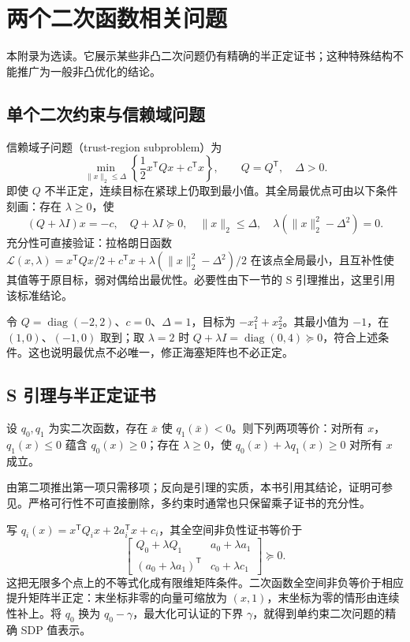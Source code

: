 \setcounter{chapter}{1} %
\chapter{两个二次函数相关问题}
\label{app:co-quadratic}

本附录为选读。它展示某些非凸二次问题仍有精确的半正定证书；这种特殊结构不能推广为一般非凸优化的结论。

\section{单个二次约束与信赖域问题}

信赖域子问题（trust-region subproblem）为
\[
 \min_{\|x\|_2\leq\Delta}\left\{\frac12x^{\mathsf T}Qx+c^{\mathsf T}x\right\},
 \qquad Q=Q^{\mathsf T},\quad\Delta>0.
\]
即使 $Q$ 不半正定，连续目标在紧球上仍取到最小值。其全局最优点可由以下条件刻画：存在 $\lambda\geq0$，使
\[
 (Q+\lambda I)x=-c,\quad Q+\lambda I\succeq0,\quad
 \|x\|_2\leq\Delta,\quad\lambda(\|x\|_2^2-\Delta^2)=0.
\]
充分性可直接验证：拉格朗日函数 $\mathcal L(x,\lambda)=x^{\mathsf T}Qx/2+c^{\mathsf T}x+\lambda(\|x\|_2^2-\Delta^2)/2$ 在该点全局最小，且互补性使其值等于原目标，弱对偶给出最优性。必要性由下一节的 S 引理推出，这里引用该标准结论。

\begin{example}
令 $Q=\operatorname{diag}(-2,2)$、$c=0$、$\Delta=1$，目标为 $-x_1^2+x_2^2$。其最小值为 $-1$，在 $(1,0)$、$(-1,0)$ 取到；取 $\lambda=2$ 时 $Q+\lambda I=\operatorname{diag}(0,4)\succeq0$，符合上述条件。这也说明最优点不必唯一，修正海塞矩阵也不必正定。
\end{example}

\section{S 引理与半正定证书}

\begin{theorem}[S 引理]
设 $q_0,q_1$ 为实二次函数，存在 $\bar x$ 使 $q_1(\bar x)<0$。则下列两项等价：对所有 $x$，$q_1(x)\leq0$ 蕴含 $q_0(x)\geq0$；存在 $\lambda\geq0$，使 $q_0(x)+\lambda q_1(x)\geq0$ 对所有 $x$ 成立。
\end{theorem}
由第二项推出第一项只需移项；反向是引理的实质，本书引用其结论，证明可参见\cite{ahmadi-slemma}。严格可行性不可直接删除，多约束时通常也只保留乘子证书的充分性。

写 $q_i(x)=x^{\mathsf T}Q_i x+2a_i^{\mathsf T}x+c_i$，其全空间非负性证书等价于
\[
 \begin{bmatrix}
 Q_0+\lambda Q_1&a_0+\lambda a_1\\
 (a_0+\lambda a_1)^{\mathsf T}&c_0+\lambda c_1
 \end{bmatrix}\succeq0.
\]
这把无限多个点上的不等式化成有限维矩阵条件。二次函数全空间非负等价于相应提升矩阵半正定：末坐标非零的向量可缩放为 $(x,1)$，末坐标为零的情形由连续性补上。将 $q_0$ 换为 $q_0-\gamma$，最大化可认证的下界 $\gamma$，就得到单约束二次问题的精确 SDP 值表示。

